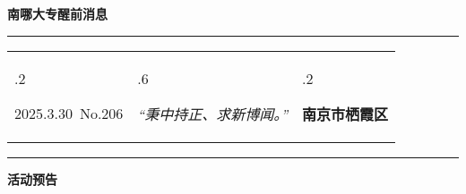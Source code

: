 \documentclass[letterpaper, 12pt]{article}
\begin{document}
\begin{center}
    \Huge\textbf{南哪大专醒前消息}
\end{center}
\vspace{4mm}
\hrule
\renewcommand\tabularxcolumn[1]{m{#1}}
\begin{tabularx}{\textwidth}{>{\hsize.2\hsize}X>{\hsize.6\hsize}X>{\hsize.2\hsize}X}
    \begin{flushleft}
        2025.3.30\, No.206
    \end{flushleft}
    &
    \begin{center}
        \textit{“秉中持正、求新博闻。”}
    \end{center}
    &
    \begin{flushright}
        \textbf{南京市栖霞区}
    \end{flushright}
\end{tabularx}
\vspace{-3.5mm}
\hrule
\vspace{4mm}
\centerline{\huge\textbf{活动预告}}
\end{document}
